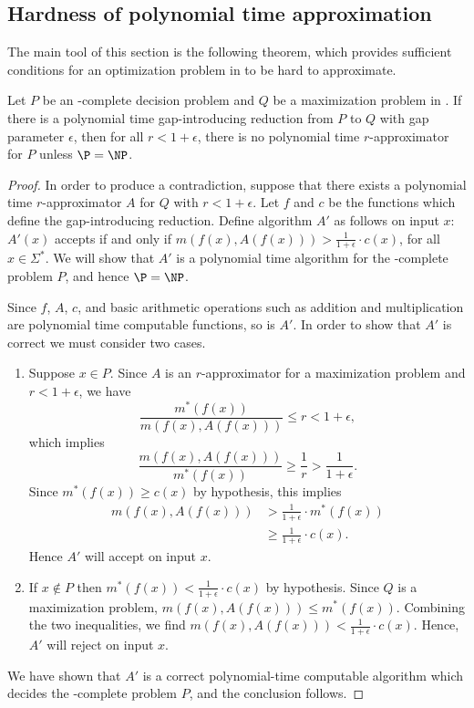 \documentclass[]{article}
\begin{document}
\subsection{Hardness of polynomial time approximation}\label{ssc:phardness}

The main tool of this section is the following theorem, which provides sufficient conditions for an optimization problem in \NPO{} to be hard to approximate.

\begin{theorem}\label{thm:gap}
  Let $P$ be an \NP-complete decision problem and $Q$ be a maximization problem in \NPO.
  If there is a polynomial time gap-introducing reduction from $P$ to $Q$ with gap parameter $\epsilon$, then for all $r < 1 + \epsilon$, there is no polynomial time $r$-approximator for $P$ unless $\P = \NP$.
\end{theorem}
\begin{proof}
  In order to produce a contradiction, suppose that there exists a polynomial time $r$-approximator $A$ for $Q$ with $r < 1 + \epsilon$.
  Let $f$ and $c$ be the functions which define the gap-introducing reduction.
  Define algorithm $A'$ as follows on input $x$: $A'(x)$ accepts if and only if $m(f(x), A(f(x))) > \frac{1}{1 + \epsilon} \cdot c(x)$, for all $x\in\Sigma^*$.
  We will show that $A'$ is a polynomial time algorithm for the \NP-complete problem $P$, and hence $\P=\NP$.

  Since $f$, $A$, $c$, and basic arithmetic operations such as addition and multiplication are polynomial time computable functions, so is $A'$.
  In order to show that $A'$ is correct we must consider two cases.
  \begin{enumerate}
  \item
    Suppose $x \in P$.
    Since $A$ is an $r$-approximator for a maximization problem and $r < 1 + \epsilon$, we have
    \begin{displaymath}
      \frac{m^*(f(x))}{m(f(x), A(f(x)))} \leq r < 1 + \epsilon,
    \end{displaymath}
    which implies
    \begin{displaymath}
      \frac{m(f(x), A(f(x)))}{m^*(f(x))} \geq \frac{1}{r} > \frac{1}{1 + \epsilon}.
    \end{displaymath}
    Since $m^*(f(x)) \geq c(x)$ by hypothesis, this implies
    \begin{align*}
      m(f(x), A(f(x))) & > \frac{1}{1 + \epsilon} \cdot m^*(f(x)) \\
      & \geq \frac{1}{1 + \epsilon} \cdot c(x).
    \end{align*}
    Hence $A'$ will accept on input $x$.
  \item
    If $x \notin P$ then $m^*(f(x)) < \frac{1}{1 + \epsilon} \cdot c(x)$ by hypothesis.
    Since $Q$ is a maximization problem, $m(f(x), A(f(x))) \leq m^*(f(x))$.
    Combining the two inequalities, we find $m(f(x), A(f(x))) < \frac{1}{1 + \epsilon} \cdot c(x)$.
    Hence, $A'$ will reject on input $x$.
  \end{enumerate}
  We have shown that $A'$ is a correct polynomial-time computable algorithm which decides the \NP-complete problem $P$, and the conclusion follows.
\end{proof}
\end{document}
